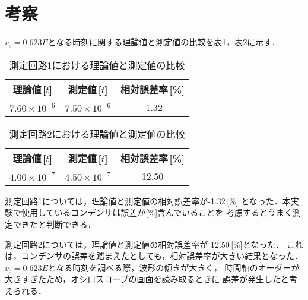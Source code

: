 
\section{考察}

$v_c=0.623E$となる時刻に関する理論値と測定値の比較を表1，表2に示す．

\begin{table}[H]
    \centering
    \caption{測定回路1における理論値と測定値の比較}
    \begin{tabular}{cc|c}
    \hline
        理論値\,[$t$] & 測定値\,[$t$] & 相対誤差率\,[\%] \\ \hline
        $7.60\times10^{-6}$ & $7.50\times10^{-6}$ & -1.32 \\ \hline
    \end{tabular}
\end{table}

\begin{table}[H]
    \centering
    \caption{測定回路2における理論値と測定値の比較}
    \begin{tabular}{cc|c}
    \hline
        理論値\,[$t$] & 測定値\,[$t$] & 相対誤差率\,[\%] \\ \hline
        $4.00\times10^{-7}$ & $4.50\times10^{-7}$ & 12.50 \\ \hline
    \end{tabular}
\end{table}

測定回路1については，理論値と測定値の相対誤差率が-1.32\,[\%]
となった．本実験で使用しているコンデンサは誤差が[\%]含んでいることを
考慮するとうまく測定できたと判断できる．

測定回路2については，理論値と測定値の相対誤差率が
12.50\,[\%]となった．
これは，コンデンサの誤差を踏まえたとしても，相対誤差率が大きい結果となった．
$v_c=0.623E$となる時刻を調べる際，波形の傾きが大きく，
時間軸のオーダーが大きすぎたため，オシロスコープの画面を読み取るときに
誤差が発生したと考えられる．
